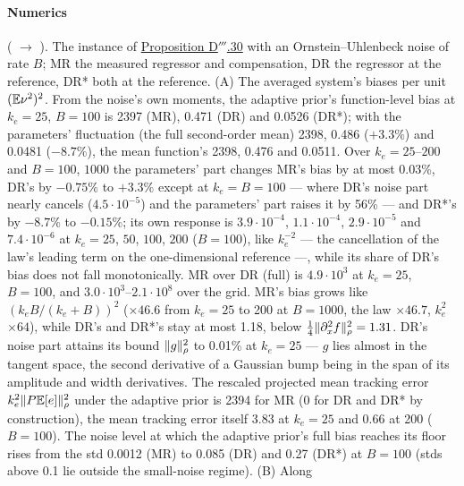 \begin{sloppypar}
\paragraph{Numerics} ( $\to$ ). The instance of
\hyperref[res:thmDppp:30]{Proposition D$'''$.30} with an Ornstein--Uhlenbeck noise of rate $B$; MR the measured
regressor and compensation, DR the regressor at the reference, DR* both at the reference. (A) The averaged system's
biases per unit $(\mathbb{E}\nu^2)^2$. From the noise's own moments, the adaptive prior's function-level bias at $k_e = 25$,
$B = 100$ is 2397 (MR), 0.471 (DR) and 0.0526 (DR*); with the parameters' fluctuation (the full second-order mean)
2398, 0.486 ($+3.3\%$) and 0.0481 ($-8.7\%$), the mean function's 2398, 0.476 and 0.0511. Over $k_e = 25$--$200$ and
$B = 100$, $1000$ the parameters' part changes MR's bias by at most 0.03\%, DR's by $-0.75\%$ to $+3.3\%$ except at
$k_e = B = 100$ --- where DR's noise part nearly cancels ($4.5\cdot10^{-5}$) and the parameters' part raises it by
56\% --- and DR*'s by $-8.7\%$ to $-0.15\%$; its own response is $3.9\cdot10^{-4}$, $1.1\cdot10^{-4}$,
$2.9\cdot10^{-5}$ and $7.4\cdot10^{-6}$ at $k_e = 25$, $50$, $100$, $200$ ($B = 100$), like $k_e^{-2}$ --- the
cancellation of the law's leading term on the one-dimensional reference ---, while its share of DR's bias does not fall
monotonically. MR over DR (full) is $4.9\cdot10^3$ at $k_e = 25$, $B = 100$, and $3.0\cdot10^3$--$2.1\cdot10^8$ over
the grid. MR's bias grows like $(k_eB/(k_e + B))^2$ ($\times46.6$ from $k_e = 25$ to 200 at $B = 1000$, the law
$\times46.7$, $k_e^2$ $\times64$), while DR's and DR*'s stay at most 1.18, below
$\frac14\lVert \partial^2_xf\rVert^2_\rho = 1.31$. DR's noise part attains its bound $\lVert g\rVert^2_\rho$ to 0.01\% at
$k_e = 25$ --- $g$ lies almost in the tangent space, the second derivative of a Gaussian bump being in the span of its
amplitude and width derivatives. The rescaled projected mean tracking error $k_e^2\lVert P\mathbb{E}[e]\rVert^2_\rho$ under the
adaptive prior is 2394 for MR (0 for DR and DR* by construction), the mean tracking error itself 3.83 at $k_e = 25$ and
0.66 at 200 ($B = 100$). The noise level at which the adaptive prior's full bias reaches its floor rises from the std
0.0012 (MR) to 0.085 (DR) and 0.27 (DR*) at $B = 100$ (stds above 0.1 lie outside the small-noise regime). (B) Along

\end{sloppypar}
